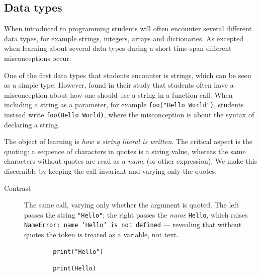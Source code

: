 \mode*
\subsection{Data types}

When introduced to programming students will often encounter several 
different data types, for example strings, integers, arrays and 
dictionaries. As excepted when learning about several data types during a 
short time-span different misconceptions occur. 

One of the first data types that students encounter is strings, which can 
be seen as a simple type. However, \textcite{GuoMarkelZhang2020} found in 
their study that students often have a misconception about how one should 
use a string in a function call. When including a string as a parameter, for 
example \texttt{foo("Hello World")}, students instead write 
\texttt{foo(Hello World)}, where the misconception is about the syntax of 
declaring a string. 

The object of learning is \emph{how a string literal is written}. The critical
aspect is the quoting: a sequence of characters in quotes is a string value,
whereas the same characters without quotes are read as a \emph{name} (or other
expression). We make this discernible by keeping the call invariant and varying
only the quotes.

\begin{description}
  \item[Contrast] The same call, varying only whether the argument is quoted.
    The left passes the string \texttt{"Hello"}; the right passes the
    \emph{name} \texttt{Hello}, which raises
    \texttt{NameError: name 'Hello' is not defined} --- revealing
    that without quotes the token is treated as a variable, not text.

    \hfill
    \begin{minipage}[t]{0.45\columnwidth}
      \begin{verbatim}
        print("Hello")
      \end{verbatim}
    \end{minipage}
    \hfill
    \begin{minipage}[t]{0.45\columnwidth}
      \begin{verbatim}
        print(Hello)
      \end{verbatim}
    \end{minipage}
\end{description}

